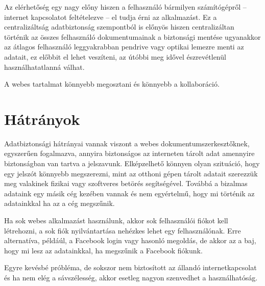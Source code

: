 Az elérhetőség egy nagy előny hiszen a felhasználó bármilyen számítógépről -- internet kapcsolatot feltételezve -- el tudja érni az alkalmazást. Ez a centralizáltság adatbiztonság szempontból is előnyös hiszen centralizáltan történik az összes felhasználó dokumentumainak a biztonsági mentése ugyanakkor az átlagos felhasználó leggyakrabban pendrive vagy optikai lemezre menti az adatait, ez előbbit el lehet veszíteni, az útóbbi meg idővel észrevétlenül használhatatlanná válhat. 

A webes tartalmat könnyebb megosztani és könnyebb a kollaboráció.

\section{Hátrányok}

Adatbiztonsági hátrányai vannak viszont a webes dokumentumszerkesztőknek, egyszerűen fogalmazva, annyira biztonságos az interneten tárolt adat amennyire biztonságban van tartva a jelszavunk. Elképzelhető könnyen olyan szituáció, hogy egy jelszót könnyebb megszerezni, mint az otthoni gépen tárolt adatait szerezzük meg valakinek fizikai vagy szoftveres betörés segítségével. Továbbá a bizalmas adataink egy másik cég kezében vannak és nem egyértelmű, hogy mi történik az adatainkkal ha az a cég megszűnik.

Ha sok webes alkalmazást használunk, akkor sok felhasználói fiókot kell létrehozni, a sok fiók nyilvántartása nehézkes lehet egy felhasználónak. Erre alternatíva, példáúl, a Facebook login vagy hasonló megoldás, de akkor az a baj, hogy mi lesz az adatainkkal, ha megszűnik a Facebook fiókunk. 

Egyre kevésbé próbléma, de sokszor nem biztosított az állandó internetkapcsolat és ha nem elég a sávszélesség, akkor esetleg nagyon szenvedhet a használhatóság.






